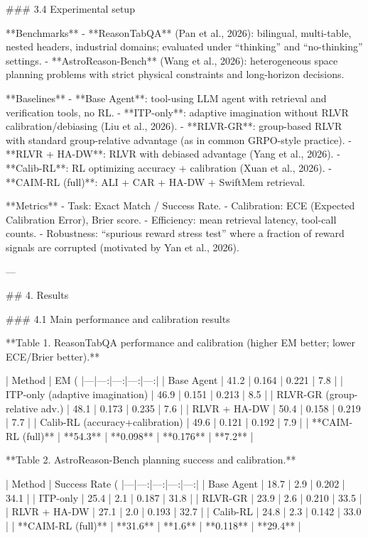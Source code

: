 ### 3.4 Experimental setup  

**Benchmarks**
- **ReasonTabQA** (Pan et al., 2026): bilingual, multi-table, nested headers, industrial domains; evaluated under “thinking” and “no-thinking” settings.  
- **AstroReason-Bench** (Wang et al., 2026): heterogeneous space planning problems with strict physical constraints and long-horizon decisions.

**Baselines**
- **Base Agent**: tool-using LLM agent with retrieval and verification tools, no RL.  
- **ITP-only**: adaptive imagination without RLVR calibration/debiasing (Liu et al., 2026).  
- **RLVR-GR**: group-based RLVR with standard group-relative advantage (as in common GRPO-style practice).  
- **RLVR + HA-DW**: RLVR with debiased advantage (Yang et al., 2026).  
- **Calib-RL**: RL optimizing accuracy + calibration (Xuan et al., 2026).  
- **CAIM-RL (full)**: ALI + CAR + HA-DW + SwiftMem retrieval.

**Metrics**
- Task: Exact Match / Success Rate.  
- Calibration: ECE (Expected Calibration Error), Brier score.  
- Efficiency: mean retrieval latency, tool-call counts.  
- Robustness: “spurious reward stress test” where a fraction of reward signals are corrupted (motivated by Yan et al., 2026).

---

## 4. Results  

### 4.1 Main performance and calibration results  

**Table 1. ReasonTabQA performance and calibration (higher EM better; lower ECE/Brier better).**

| Method | EM (%
|---|---:|---:|---:|---:|
| Base Agent | 41.2 | 0.164 | 0.221 | 7.8 |
| ITP-only (adaptive imagination) | 46.9 | 0.151 | 0.213 | 8.5 |
| RLVR-GR (group-relative adv.) | 48.1 | 0.173 | 0.235 | 7.6 |
| RLVR + HA-DW | 50.4 | 0.158 | 0.219 | 7.7 |
| Calib-RL (accuracy+calibration) | 49.6 | 0.121 | 0.192 | 7.9 |
| **CAIM-RL (full)** | **54.3** | **0.098** | **0.176** | **7.2** |

**Table 2. AstroReason-Bench planning success and calibration.**

| Method | Success Rate (%
|---|---:|---:|---:|---:|
| Base Agent | 18.7 | 2.9 | 0.202 | 34.1 |
| ITP-only | 25.4 | 2.1 | 0.187 | 31.8 |
| RLVR-GR | 23.9 | 2.6 | 0.210 | 33.5 |
| RLVR + HA-DW | 27.1 | 2.0 | 0.193 | 32.7 |
| Calib-RL | 24.8 | 2.3 | 0.142 | 33.0 |
| **CAIM-RL (full)** | **31.6** | **1.6** | **0.118** | **29.4** |

